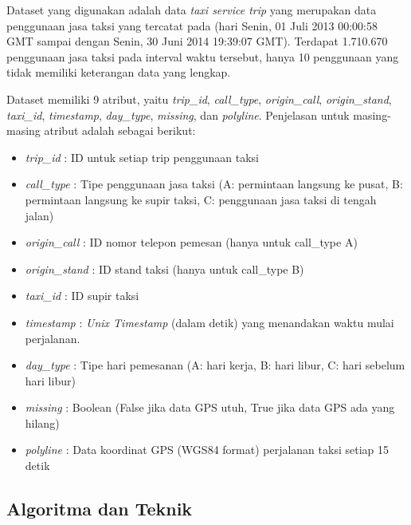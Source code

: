 \documentclass{article}
\begin{document}
\begin{adjustwidth}{2em}{0pt}

\hspace{\parindent}Dataset yang digunakan adalah data \textit{taxi service trip} yang merupakan data penggunaan jasa taksi yang tercatat pada (hari Senin, 01 Juli 2013 00:00:58 GMT sampai dengan Senin, 30 Juni 2014 19:39:07 GMT). Terdapat 1.710.670 penggunaan jasa taksi pada interval waktu tersebut, hanya 10 penggunaan yang tidak memiliki keterangan data yang lengkap.

Dataset memiliki 9 atribut, yaitu \textit{trip\_id}, \textit{call\_type}, \textit{origin\_call}, \textit{origin\_stand}, \textit{taxi\_id}, \textit{timestamp}, \textit{day\_type}, \textit{missing}, dan \textit{polyline}. Penjelasan untuk masing-masing atribut adalah sebagai berikut:

\begin{itemize}
\item{\textit{trip\_id} : ID untuk setiap trip penggunaan taksi}
\item{\textit{call\_type} : Tipe penggunaan jasa taksi (A: permintaan langsung ke pusat, B: permintaan langsung ke supir taksi, C: penggunaan jasa taksi di tengah jalan)}
\item{\textit{origin\_call} : ID nomor telepon pemesan (hanya untuk call\_type A)}
\item{\textit{origin\_stand} : ID stand taksi (hanya untuk call\_type B)}
\item{\textit{taxi\_id} : ID supir taksi}
\item{\textit{timestamp} : \textit{Unix Timestamp} (dalam detik) yang menandakan waktu mulai perjalanan.}
\item{\textit{day\_type} :  Tipe hari pemesanan (A: hari kerja, B: hari libur, C: hari sebelum hari libur)}
\item{\textit{missing} : Boolean (False jika data GPS utuh, True jika data GPS ada yang hilang)}
\item{\textit{polyline} : Data koordinat GPS (WGS84 format) perjalanan taksi setiap 15 detik}
\end{itemize}

\end{adjustwidth}

\subsection{Algoritma dan Teknik}
\end{document}
